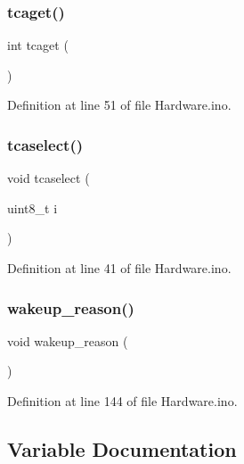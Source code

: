 \mbox{\label{_hardware_8ino_a0fc8cb706c907413f791d3cd61d0a72b}} 
\subsubsection{\texorpdfstring{tcaget()}{tcaget()}}
{\footnotesize\ttfamily int tcaget (\begin{DoxyParamCaption}{ }\end{DoxyParamCaption})}



Definition at line 51 of file Hardware.\+ino.

\mbox{\label{_hardware_8ino_aa8d3539c1351069c65956d2dad78bb6c}} 
\subsubsection{\texorpdfstring{tcaselect()}{tcaselect()}}
{\footnotesize\ttfamily void tcaselect (\begin{DoxyParamCaption}\item[{uint8\+\_\+t}]{i }\end{DoxyParamCaption})}



Definition at line 41 of file Hardware.\+ino.

\mbox{\label{_hardware_8ino_ad8516e8020f21b3133a73c8ae31728ad}} 
\subsubsection{\texorpdfstring{wakeup\_reason()}{wakeup\_reason()}}
{\footnotesize\ttfamily void wakeup\+\_\+reason (\begin{DoxyParamCaption}{ }\end{DoxyParamCaption})}



Definition at line 144 of file Hardware.\+ino.



\subsection{Variable Documentation}
\mbox{\label{_hardware_8ino_a23fc805921fc5a0002591c4189b52b1d}} 
